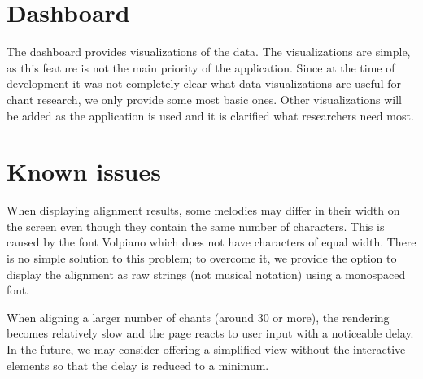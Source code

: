 \section{Dashboard}

The dashboard provides visualizations of the data. The visualizations are simple, as this feature is not the main priority of the application. Since at the time of development
it was not completely clear what data visualizations are useful for chant research, we only provide some most basic ones. Other visualizations will be added
as the application is used and it is clarified what researchers need most.


\section{Known issues}

When displaying alignment results, some melodies may differ in their width on the screen even though they contain the same number of characters. This is caused by the font
Volpiano which does not have characters of equal width. There is no simple solution to this problem; to overcome it, we provide the option to display the alignment
as raw strings (not musical notation) using a monospaced font.

When aligning a larger number of chants (around 30 or more), the rendering becomes relatively slow and the page reacts to user input with a noticeable delay.
In the future, we may consider offering a simplified view without the interactive elements so that the delay is reduced to a minimum.
